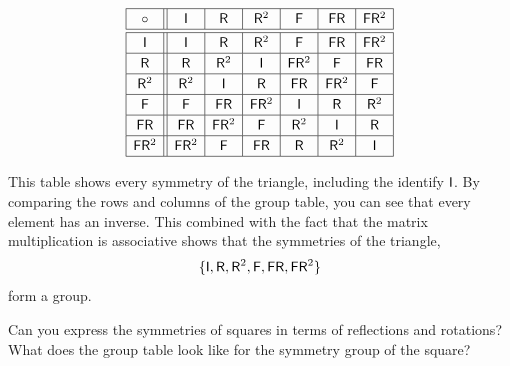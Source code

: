 \[
{
\renewcommand{\arraystretch}{1.2}
\begin{array}{| c || c | c | c |c | c | c |}
\hline
\circ & \mat{I} & \mat{R} & \mat{R}^2  & \mat{F} & \mat{F} \mat{R} &  \mat{F} \mat{R}^2  \\ \hline \hline
\mat{I} & \mat{I} & \mat{R} & \mat{R}^2 & \mat{F} & \mat{F} \mat{R} & \mat{F} \mat{R}^2 \\ \hline
\mat{R} & \mat{R} & \mat{R}^2 & \mat{I} & \mat{F} \mat{R}^2 & \mat{F} & \mat{F} \mat{R} \\ \hline
\mat{R}^2 & \mat{R}^2 & \mat{I} & \mat{R} & \mat{F} \mat{R} & \mat{F} \mat{R}^2 & \mat{F}  \\ \hline
\mat{F} & \mat{F} & \mat{F} \mat{R} & \mat{F} \mat{R}^2 & \mat{I} & \mat{R} & \mat{R}^2 \\ \hline
\mat{F} \mat{R} & \mat{F} \mat{R} & \mat{F} \mat{R}^2 & \mat{F} & \mat{R}^2 & \mat{I} & \mat{R}  \\ \hline
\mat{F} \mat{R}^2 & \mat{F} \mat{R}^2 & \mat{F} & \mat{F} \mat{R} & \mat{R} & \mat{R}^2 & \mat{I}\\ \hline
\end{array}}
\]

This table shows every symmetry of the triangle, including the
identify $\mathsf{I}$. By comparing the rows and columns of the group
table, you can see that every element has an inverse. This combined
with the fact that the matrix multiplication is associative shows that
the symmetries of the triangle,
\[
\{ \mathsf{I},\mathsf{R},\mathsf{R}^2,\mathsf{F},\mathsf{F} \mathsf{R},  \mathsf{F} \mathsf{R}^2\}
\]
form a group.

\begin{question} 
Can you express the symmetries of squares in terms of reflections
and rotations? What does the group table look like for the symmetry
group of the square?
\end{question}
\QM


